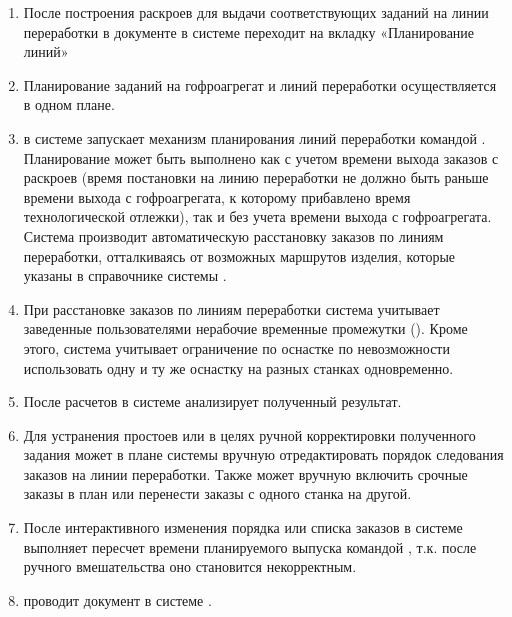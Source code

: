 \begin{enumerate}

\item	После построения раскроев для выдачи соответствующих заданий на линии переработки \planner в документе  в системе \gofro переходит на вкладку «Планирование линий»
\item	Планирование заданий на гофроагрегат и линий переработки осуществляется в одном плане.
\item	\planner в системе \gofro запускает механизм планирования линий переработки командой . Планирование может быть выполнено как с учетом времени выхода заказов с раскроев (время постановки на линию переработки не должно быть раньше времени выхода с гофроагрегата, к которому прибавлено время технологической отлежки), так и без учета времени выхода с гофроагрегата. Система \gofro производит автоматическую расстановку заказов по линиям переработки, отталкиваясь от возможных маршрутов изделия, которые указаны в справочнике   системы \gofro.
\item	При расстановке заказов по линиям переработки система \gofro учитывает заведенные пользователями нерабочие временные промежутки (). Кроме этого, система учитывает ограничение по оснастке по невозможности использовать одну и ту же оснастку на разных станках одновременно.
\item	После расчетов \planner в системе \gofro анализирует полученный результат.
\item	Для устранения простоев или в целях ручной корректировки полученного задания \planner может в плане системы \gofro вручную отредактировать порядок следования заказов на линии переработки. Также \planner может вручную включить срочные заказы в план или перенести заказы с одного станка на другой.
\item	После интерактивного изменения порядка или списка заказов \planner в системе \gofro выполняет пересчет времени планируемого выпуска командой , т.к. после ручного вмешательства оно становится некорректным.

\item	\planner проводит документ   в системе \gofro.
\end{enumerate}



